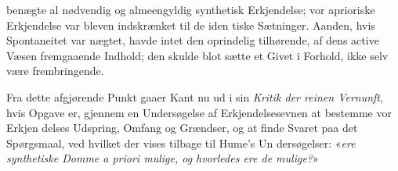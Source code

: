 \documentclass[12pt,a4paper]{book}
\begin{document}
benægte al nødvendig og almeengyldig synthetisk Erkjendelse;
vor aprioriske Erkjendelse var bleven indskrænket til de iden\-%
tiske Sætninger. Aanden, hvis Spontaneitet var nægtet,
havde intet den oprindelig tilhørende, af dens active Væsen
fremgaaende Indhold; den skulde blot sætte et Givet i Forhold,
ikke selv være frembringende.

Fra dette afgjørende Punkt gaaer Kant nu ud i sin
\emph{Kritik der reinen Vernunft}, hvis Opgave er, gjennem en
Undersøgelse af Erkjendelsesevnen at bestemme vor Erkjen\-%
delses Udspring, Omfang og Grændser, og at finde Svaret paa
det Spørgsmaal, ved hvilket der vises tilbage til Hume's Un\-%
dersøgelser: «\emph{ere synthetiske Domme a priori mulige,
og hvorledes ere de mulige?}»
\end{document}
